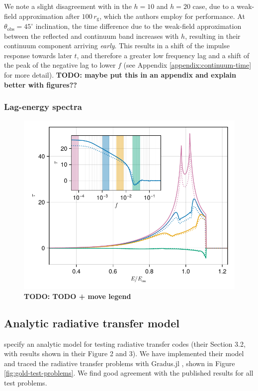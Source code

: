 \documentclass[fleqn,usenatbib]{mnras}
\newcommand{\todo}[1]{{\noindent \bf \color{red} TODO: #1}}
\newcommand{\Gradus}{Gradus.jl }
\newcommand{\rg}{r_\text{g}}
\begin{document}
We note a slight disagreement with \cite{cackett_modelling_2014} in the $h = 10$ and $h=20$ case, due to a weak-field approximation after $100\, \rg$, which the authors employ for performance. At $\theta_\text{obs} = 45^\circ$ inclination, the time difference due to the weak-field approximation between the reflected and continuum band increases with $h$, resulting in their continuum component arriving \textit{early}. This results in a shift of the impulse response towards later $t$, and therefore a greater low frequency lag and a shift of the peak of the negative lag to lower $f$ (see Appendix \ref{appendix:continuum-time} for more detail).
\todo{maybe put this in an appendix and explain better with figures??}

\subsubsection{Lag-energy spectra}

\begin{figure}
	\centering
	\includegraphics[width=0.98\linewidth]{figures/reverberation.lag-energy.pdf}
	\caption{\todo{TODO + move legend}}
	\label{fig:lag-energy}
\end{figure}


\subsection{Analytic radiative transfer model}

\cite{gold_verification_2020} specify an analytic model for testing radiative transfer codes (their Section 3.2, with results shown in their Figure 2 and 3). We have implemented their model and traced the radiative transfer problems with \Gradus, shown in Figure \ref{fig:gold-test-problems}. We find good agreement with the published results for all test problems.
\end{document}

